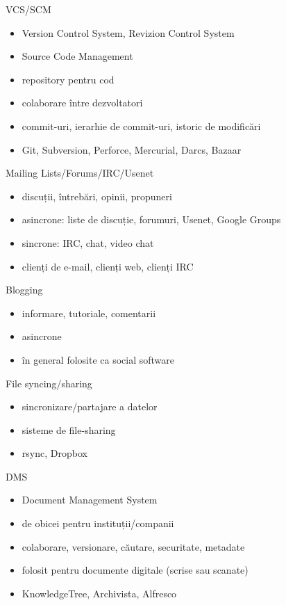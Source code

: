 \documentclass{beamer}
\begin{document}
\begin{frame}{VCS/SCM}
  \begin{itemize}
    \item Version Control System, Revizion Control System
    \item Source Code Management
    \item repository pentru cod
    \item colaborare între dezvoltatori
    \item commit-uri, ierarhie de commit-uri, istoric de modificări
    \item Git, Subversion, Perforce, Mercurial, Darcs, Bazaar
  \end{itemize}
\end{frame}

\begin{frame}{Mailing Lists/Forums/IRC/Usenet}
  \begin{itemize}
    \item discuții, întrebări, opinii, propuneri
    \item asincrone: liste de discuție, forumuri, Usenet, Google Groups
    \item sincrone: IRC, chat, video chat
    \item clienți de e-mail, clienți web, clienți IRC
  \end{itemize}
\end{frame}

\begin{frame}{Blogging}
  \begin{itemize}
    \item informare, tutoriale, comentarii
    \item asincrone
    \item în general folosite ca social software
  \end{itemize}
\end{frame}

\begin{frame}{File syncing/sharing}
  \begin{itemize}
    \item sincronizare/partajare a datelor
    \item sisteme de file-sharing
    \item rsync, Dropbox
  \end{itemize}
\end{frame}

\begin{frame}{DMS}
  \begin{itemize}
    \item Document Management System
    \item de obicei pentru instituții/companii
    \item colaborare, versionare, căutare, securitate, metadate
    \item folosit pentru documente digitale (scrise sau scanate)
    \item KnowledgeTree, Archivista, Alfresco
  \end{itemize}
\end{frame}
\end{document}

